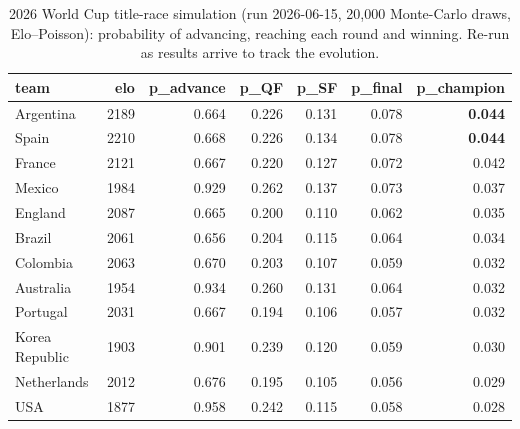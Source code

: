 \begin{table}[t]
  \centering
  \caption{2026 World Cup title-race simulation (run 2026-06-15, 20,000 Monte-Carlo draws, Elo–Poisson): probability of advancing, reaching each round and winning. Re-run as results arrive to track the evolution.}
  \label{tab:wc2026_tournament}
  \begin{tabular}{lrrrrrr}
  \toprule
  team & elo & p\_advance & p\_QF & p\_SF & p\_final & p\_champion \\
  \midrule
  Argentina & 2189 & 0.664 & 0.226 & 0.131 & 0.078 & \textbf{0.044} \\
  Spain & 2210 & 0.668 & 0.226 & 0.134 & 0.078 & \textbf{0.044} \\
  France & 2121 & 0.667 & 0.220 & 0.127 & 0.072 & 0.042 \\
  Mexico & 1984 & 0.929 & 0.262 & 0.137 & 0.073 & 0.037 \\
  England & 2087 & 0.665 & 0.200 & 0.110 & 0.062 & 0.035 \\
  Brazil & 2061 & 0.656 & 0.204 & 0.115 & 0.064 & 0.034 \\
  Colombia & 2063 & 0.670 & 0.203 & 0.107 & 0.059 & 0.032 \\
  Australia & 1954 & 0.934 & 0.260 & 0.131 & 0.064 & 0.032 \\
  Portugal & 2031 & 0.667 & 0.194 & 0.106 & 0.057 & 0.032 \\
  Korea Republic & 1903 & 0.901 & 0.239 & 0.120 & 0.059 & 0.030 \\
  Netherlands & 2012 & 0.676 & 0.195 & 0.105 & 0.056 & 0.029 \\
  USA & 1877 & 0.958 & 0.242 & 0.115 & 0.058 & 0.028 \\
  \bottomrule
  \end{tabular}
\end{table}
